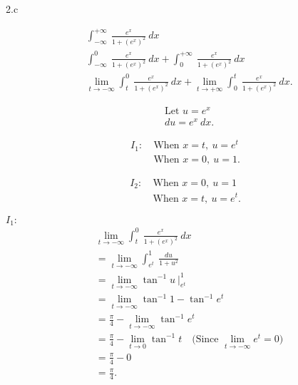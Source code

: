 \documentclass{report}
\begin{document}
    \pagebreak \bigbreak \noindent
    2.c
    \bigbreak \noindent 
    \begin{minipage}[]{0.5\textwidth}
        \begin{align*} 
            &\int_{-\infty}^{+\infty}\ \frac{e^{x}}{1+(e^{x})^{2}}\ dx \\
            &\int_{-\infty}^{0}\ \frac{e^{x}}{1+(e^{x})^{2}}\ dx + \int_{0}^{+\infty}\ \frac{e^{x}}{1+(e^{x})^{2}}\ dx \\
            &\lim\limits_{t \to -\infty}{\int_{t}^{0}\ \frac{e^{x}}{1+(e^{x})^{2}}}\ dx +\lim\limits_{t \to +\infty}\int_{0}^{t}\ \frac{e^{x}}{1+(e^{x})^{2}}\ dx
        .\end{align*}
    \end{minipage}
    \begin{minipage}[]{0.47\textwidth}
        \begin{align*}
            &\text{Let $u=e^{x}$}  \\
            &du=e^{x}\ dx
        .\end{align*}
        \begin{minipage}[]{0.47\textwidth}
            \begin{align*}
                I_{1}:\ &\text{When } x=t,\ u=e^{t}\\
                        &\text{When } x=0,\ u=1
            .\end{align*}
        \end{minipage}
        \begin{minipage}[]{0.47\textwidth}
             \begin{align*}
                 I_{2}:\ &\text{When } x=0,\ u=1\\
                &\text{When } x=t,\ u=e^{t}
            .\end{align*}
        \end{minipage}
    \end{minipage}
    \bigbreak \noindent 
    $I_{1}:$
    \begin{align*}
       &\lim\limits_{t \to -\infty}{\int_{t}^{0}\ \frac{e^{x}}{1+(e^{x})^{2}}\ dx}  \\
       &=\lim\limits_{t \to -\infty}{\int_{e^{t}}^{1}\ \frac{du}{1+u^{2}}} \\
       &=\lim\limits_{t \to -\infty}{\tan^{-1}{u}}\ \bigg|_{e^{t}}^{1} \\
       &=\lim\limits_{t \to -\infty}{\tan^{-1}{1} - \tan^{-1}{e^{t}}} \\
       &= \frac{\pi}{4} - \lim\limits_{t \to -\infty}{\tan^{-1}{e^{t}}} \\
       &=\frac{\pi}{4} - \lim\limits_{t \to 0}{\tan^{-1}{t}} \quad \text{(Since $\lim\limits_{t \to -\infty}{e^{t} = 0} $)} \\
       &= \frac{\pi}{4} - 0 \\
       &=\frac{\pi}{4}
    .\end{align*}
\end{document}
